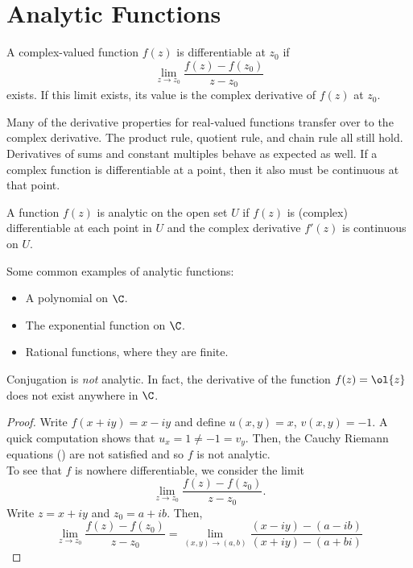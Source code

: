 \section{Analytic Functions}

\begin{definition}
    A complex-valued function $f(z)$ is differentiable at $z_0$ if 
        \[\lim_{z \to z_0} \frac{f(z) - f(z_0)}{z-z_0}\]
    exists. If this limit exists, its value is the complex derivative of $f(z)$ at $z_0$.
\end{definition}

Many of the derivative properties for real-valued functions transfer over to the complex derivative. The product rule, quotient rule, and chain rule all still hold. Derivatives of sums and constant multiples behave as expected as well. If a complex function is differentiable at a point, then it also must be continuous at that point.

\begin{definition}[Analytic]
    A function $f(z)$ is analytic on the open set $U$ if $f(z)$ is (complex) differentiable at each point in $U$  and the complex derivative $f'(z)$ is continuous on $U$.
\end{definition}

\begin{example}
    Some common examples of analytic functions:

    \begin{itemize}
        \item A polynomial on $\C$.
        \item The exponential function on $\C$.
        \item Rational functions, where they are finite.
    \end{itemize}
\end{example}

\begin{example}
    Conjugation is \emph{not} analytic. In fact, the derivative of the function $f(z) = \ol{z}$ does not exist anywhere in $\C$.

    \begin{proof}
        Write $f(x + iy) = x -iy$ and define $u(x,y) = x$, $v(x,y) = -1$. A quick computation shows that $u_x = 1 \neq -1 = v_y$. Then, the Cauchy Riemann equations () are not satisfied and so $f$ is not analytic.\\

        To see that $f$ is nowhere differentiable, we consider the limit
            \[\lim_{z \to z_0} \frac{f(z) - f(z_0)}{z - z_0}.\]
        Write $z = x + iy$ and $z_0 = a + ib$. Then,
            \[\lim_{z \to z_0} \frac{f(z) - f(z_0)}{z - z_0} = \lim_{(x,y) \to (a,b)} \frac{(x-iy) - (a - ib)}{(x + iy) - (a+bi)}\]
    \end{proof}
\end{example}

